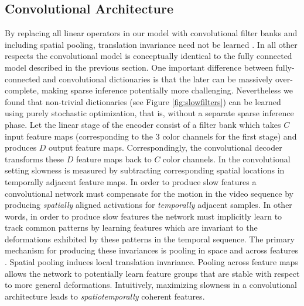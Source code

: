 \subsection{Convolutional Architecture} By replacing all linear operators in
our model with convolutional filter banks and including spatial pooling,
translation invariance need not be learned \cite{LeCun1998}. In all other
respects the convolutional model is conceptually identical to the fully
connected model described in the previous section. One important difference
between fully-connected and convolutional dictionaries is that the later can be
massively over-complete, making sparse inference potentially more challenging.
Nevertheless we found that non-trivial dictionaries (see Figure
\ref{fig:slowfilters}) can be learned using purely stochastic optimization,
that is, without a separate sparse inference phase. Let the linear stage of the
encoder consist of a filter bank which takes $C$ input feature maps
(corresponding to the 3 color channels for the first stage) and produces $D$
output feature maps. Correspondingly, the convolutional decoder transforms
these $D$ feature maps back to $C$ color channels. In the convolutional setting
slowness is measured by subtracting corresponding spatial locations in
temporally adjacent feature maps. In order to produce slow features a
convolutional network must compensate for the motion in the video sequence by
producing \emph{spatially} aligned activations for \emph{temporally} adjacent
samples. In other words, in order to produce slow features the network must
implicitly learn to track common patterns by learning features which are
invariant to the deformations exhibited by these patterns in the temporal
sequence. The primary mechanism for producing these invariances is pooling in
space and across features \cite{MaxOut}. Spatial pooling induces local
translation invariance. Pooling across feature maps allows the network to
potentially learn feature groups that are stable with respect to more general
deformations. Intuitively, maximizing slowness in a convolutional architecture
leads to \emph{spatiotemporally} coherent features.  
